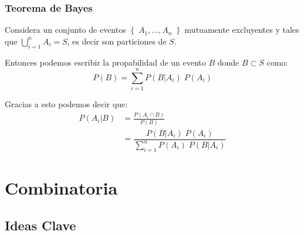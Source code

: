 \documentclass[12pt, fleqn]{report}                             %
\theoremstyle{break}                                            %
\newcommand{\Set}[1]            {\left\{ \; #1 \; \right\}}     %
\begin{document}
            \clearpage
            \subsection{Teorema de Bayes}

                Considera un conjunto de eventos $\Set{A_1, \dots, A_n}$ mutuamente excluyentes
                y tales que $\displaystyle \bigcup_{i=1}^n A_i = S$, es decir son particiones de $S$.

                Entonces podemos escribir la propabilidad de un evento $B$ donde $B \subset S$ como:
                \begin{equation*}
                    P(B) 
                        = \sum_{i = 1}^n P(B | A_i) \; P(A_i) 
                \end{equation*}


                Gracias a esto podemos decir que:
                \begin{align*}
                    P(A_i | B) 
                        &= \frac{P(A_i \cap B)}{P(B)}                                                        \\
                        &= \dfrac{P(B | A_i) \; P(A_i)}{\displaystyle \sum_{i = 1}^n P(A_i) \; P(B | A_i)}
                \end{align*}





    \chapter{Combinatoria}

        \clearpage
        \section{Ideas Clave}
\end{document}
